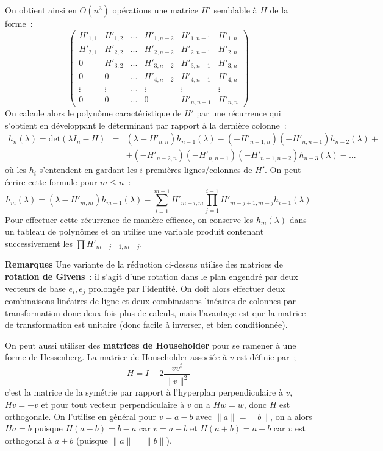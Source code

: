\documentclass[a4paper,11pt]{article}
\begin{document}
\begin{giacjshere}
On obtient ainsi en $O(n^3)$ opérations
une matrice $H'$ semblable à $H$ de la forme~:
\[
\left(\begin{array}{cccccc}
H'_{1,1} & H'_{1,2} & ... & H'_{1,n-2} & H'_{1,n-1} & H'_{1,n}\\
H'_{2,1} & H'_{2,2} & ... & H'_{2,n-2} & H'_{2,n-1} & H'_{2,n} \\
0       & H'_{3,2} & ... & H'_{3,n-2} & H'_{3,n-1} & H'_{3,n} \\
0       & 0       & ... & H'_{4,n-2} & H'_{4,n-1} & H'_{4,n} \\
\vdots  & \vdots  & ... & \vdots & \vdots  &  \vdots \\
0       & 0       & ... & 0 & H'_{n,n-1} & H'_{n,n}
\end{array} \right)
\]
On calcule alors le polynôme caractéristique de $H'$ par une récurrence
qui s'obtient en développant le déterminant par rapport à la derni\`ere
colonne~:
\begin{eqnarray*}
 h_n(\lambda) = \mbox{det}(\lambda I_n-H)&=& 
(\lambda-H'_{n,n}) h_{n-1}(\lambda) -(-H'_{n-1,n}) (-H'_{n,n-1}) 
h_{n-2}(\lambda) + \\
& & 
    + (-H'_{n-2,n}) (-H'_{n,n-1}) (-H'_{n-1,n-2}) h_{n-3}(\lambda) - ...
\end{eqnarray*}
où les $h_i$ s'entendent en gardant les $i$ premières lignes/colonnes de $H'$.
On peut \'ecrire cette formule pour $m\leq n$~:
\[ h_m(\lambda)= (\lambda - H'_{m,m}) h_{m-1}(\lambda)
-\sum_{i=1}^{m-1} H'_{m-i,m} \prod_{j=1}^{i-1} H'_{m-j+1,m-j} h_{i-1}(\lambda)\]
Pour effectuer cette r\'ecurrence de mani\`ere efficace, on conserve
les $h_m(\lambda)$ dans un tableau de polyn\^omes et on utilise une 
variable produit contenant successivement les $\prod H'_{m-j+1,m-j}$.

{\bf Remarques}
Une variante de la r\'eduction ci-dessus utilise des matrices de
{\bf rotation de Givens}~: il s'agit d'une rotation
dans le plan engendr\'e par deux vecteurs de base $e_i,e_j$ 
prolong\'ee par l'identit\'e. On doit alors effectuer 
deux combinaisons lin\'eaires de ligne
et deux combinaisons lin\'eaires de colonnes par transformation
donc deux fois plus de calculs, mais l'avantage est que la matrice
de transformation est unitaire (donc facile \`a inverser, et bien
conditionn\'ee).

On peut aussi utiliser des {\bf matrices de
Householder} 
pour  se ramener \`a une forme de Hessenberg.
La matrice de Householder associ\'ee \`a $v$ est d\'efinie par~;
$$H=I-2\frac{v v^t}{\|v\|^2}$$
c'est la matrice de la sym\'etrie par rapport \`a l'hyperplan 
perpendiculaire \`a $v$, $Hv=-v$ et pour tout vecteur
perpendiculaire \`a $v$ on a $Hw=w$, donc $H$ est orthogonale.
On l'utilise en g\'en\'eral pour $v=a-b$ avec $\|a\|=\|b\|$,
on a alors $Ha=b$ puisque $H(a-b)=b-a$ car $v=a-b$ et $H(a+b)=a+b$
car $v$ est orthogonal \`a $a+b$ (puisque $\|a\|=\|b\|$).


\end{giacjshere}
\end{document}
